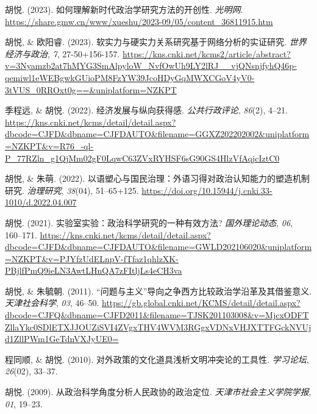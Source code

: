 \documentclass[
  12pt,
]
{article}
\newlength{\cslhangindent}
\newlength{\cslentryspacingunit} %
\newenvironment{CSLReferences}[2] %
 {%
  \setlength{\parindent}{0pt}
  \ifodd #1
  \let\oldpar\par
  \def\par{\hangindent=\cslhangindent\oldpar}
  \fi
  \setlength{\parskip}{#2\cslentryspacingunit}
 }%
 {}
\begin{document}
\hypertarget{refs-chinese}{}
\begin{CSLReferences}{1}{0}
\leavevmode{}%
胡悦. (2023). {如何理解新时代政治学研究方法的开创性}. \emph{光明网}.
\url{https://share.gmw.cn/www/xueshu/2023-09/05/content_36811915.htm}

\leavevmode{}%
胡悦, \& 欧阳睿. (2023).
{软实力与硬实力关系研究{\textemdash}{\textemdash}基于网络分析的实证研究}.
\emph{世界经济与政治}, \emph{7}, 27-50+156-157.
\url{https://kns.cnki.net/kcms2/article/abstract?v=3Nyamzb2at7hMYG3SmAlpyloW_NvfOwUh9LY2lRJ__vjQNsnjfyhQ46p-qemiwl1eWEBgwkGUioPM8FzYW39JcoHDyGqMWXCGoV4yV0-3tVUS_0RROxt0g==\&uniplatform=NZKPT}

\leavevmode{}%
季程远, \& 胡悦. (2022). 经济发展与纵向获得感. \emph{公共行政评论},
\emph{86}(2), 4--21.
\url{https://kns.cnki.net/kcms/detail/detail.aspx?dbcode=CJFD\&dbname=CJFDAUTO\&filename=GGXZ202202002\&uniplatform=NZKPT\&v=R76_-ql-P_77RZln_g1QjMm02gF0LqwC63ZVxRYHSF6sG90GS4HlzVfAqjcIztC0}

\leavevmode{}%
胡悦, \& 朱萌. (2022).
{以语塑心与国民治理：外语习得对政治认知能力的塑造机制研究}.
\emph{治理研究}, \emph{38}(04), 51--65+125.
\url{https://doi.org/10.15944/j.cnki.33-1010/d.2022.04.007}

\leavevmode{}%
胡悦. (2021). {实验室实验：政治科学研究的一种有效方法?}
\emph{国外理论动态}, \emph{06}, 160--171.
\url{https://kns.cnki.net/kcms/detail/detail.aspx?dbcode=CJFD\&dbname=CJFDAUTO\&filename=GWLD202106020\&uniplatform=NZKPT\&v=PJYfzUdELnpV-fTfaz1qhlzXK-PBjlfPmQ9ieLN3AwtLHnQA7zFItljLs4eCH3va}

\leavevmode{}%
胡悦, \& 朱毓朝. (2011).
{{``问题与主义''}导向之争{\textemdash}{\textemdash}西方比较政治学沿革及其借鉴意义}.
\emph{天津社会科学}, \emph{03}, 46--50.
\url{https://gb.global.cnki.net/KCMS/detail/detail.aspx?dbcode=CJFQ\&dbname=CJFD2011\&filename=TJSK201103008\&v=MjcxODFTZllaYkc0SDlETXJJOUZiSVI4ZVgxTHV4WVM3RGgxVDNxVHJXTTFGckNVUjd1ZllPWm1GeTdnVXJyUE0=}

\leavevmode{}%
程同顺, \& 胡悦. (2010).
{对外政策的文化道具{\textemdash}{\textemdash}浅析文明冲突论的工具性}.
\emph{学习论坛}, \emph{26}(02), 33--37.

\leavevmode{}%
胡悦. (2009). {从政治科学角度分析人民政协的政治定位}.
\emph{天津市社会主义学院学报}, \emph{01}, 19--23.

\end{CSLReferences}
\end{document}
